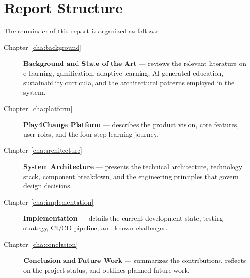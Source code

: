 \section{Report Structure}
\label{sec:structure}

The remainder of this report is organized as follows:

\begin{description}
    \item[Chapter~\ref{cha:background}] \textbf{Background and State of the Art} — reviews the relevant literature on e-learning, gamification, adaptive learning, AI-generated education, sustainability curricula, and the architectural patterns employed in the system.
    \item[Chapter~\ref{cha:platform}] \textbf{Play4Change Platform} — describes the product vision, core features, user roles, and the four-step learning journey.
    \item[Chapter~\ref{cha:architecture}] \textbf{System Architecture} — presents the technical architecture, technology stack, component breakdown, and the engineering principles that govern design decisions.
    \item[Chapter~\ref{cha:implementation}] \textbf{Implementation} — details the current development state, testing strategy, CI/CD pipeline, and known challenges.
    \item[Chapter~\ref{cha:conclusion}] \textbf{Conclusion and Future Work} — summarizes the contributions, reflects on the project status, and outlines planned future work.
\end{description}
